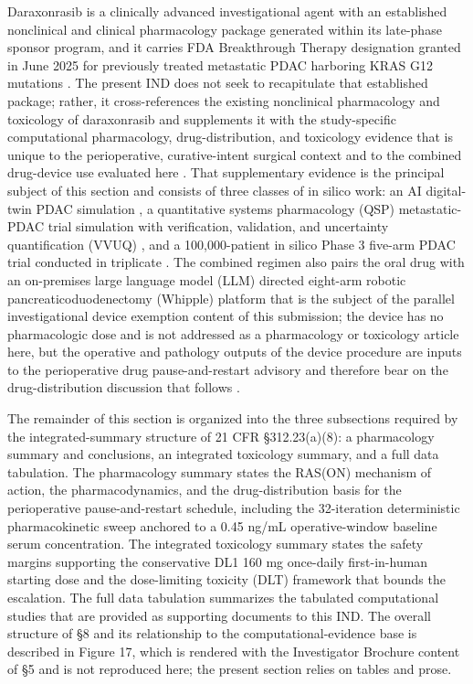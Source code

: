 Daraxonrasib is a clinically advanced investigational agent with an established
nonclinical and clinical pharmacology package generated within its late-phase
sponsor program, and it carries FDA Breakthrough Therapy designation granted in
June 2025 for previously treated metastatic PDAC harboring KRAS G12 mutations
\cite{daraxwhipple}. The present IND does not seek to recapitulate that
established package; rather, it cross-references the existing nonclinical
pharmacology and toxicology of daraxonrasib and supplements it with the
study-specific computational pharmacology, drug-distribution, and toxicology
evidence that is unique to the perioperative, curative-intent surgical context
and to the combined drug-device use evaluated here \cite{daraxwhipple,onpremwhippl}.
That supplementary evidence is the principal subject of this section and consists
of three classes of in silico work: an AI digital-twin PDAC simulation
\cite{fdadigtwinpc}, a quantitative systems pharmacology (QSP) metastatic-PDAC
trial simulation with verification, validation, and uncertainty quantification
(VVUQ) \cite{qspmetpancre}, and a 100,000-patient in silico Phase 3 five-arm
PDAC trial conducted in triplicate \cite{chatgpt100kp,pdacdigtwinp}. The combined
regimen also pairs the oral drug with an on-premises large language model (LLM)
directed eight-arm robotic pancreaticoduodenectomy (Whipple) platform that is the
subject of the parallel investigational device exemption content of this
submission; the device has no pharmacologic dose and is not addressed as a
pharmacology or toxicology article here, but the operative and pathology outputs
of the device procedure are inputs to the perioperative drug pause-and-restart
advisory and therefore bear on the drug-distribution discussion that follows
\cite{daraxwhipple}.

The remainder of this section is organized into the three subsections required
by the integrated-summary structure of 21 CFR \S 312.23(a)(8): a pharmacology
summary and conclusions, an integrated toxicology summary, and a full data
tabulation. The pharmacology summary states the RAS(ON) mechanism of action, the
pharmacodynamics, and the drug-distribution basis for the perioperative
pause-and-restart schedule, including the 32-iteration deterministic
pharmacokinetic sweep anchored to a 0.45 ng/mL operative-window baseline serum
concentration. The integrated toxicology summary states the safety margins
supporting the conservative DL1 160 mg once-daily first-in-human starting dose
and the dose-limiting toxicity (DLT) framework that bounds the escalation. The
full data tabulation summarizes the tabulated computational studies that are
provided as supporting documents to this IND. The overall structure of \S 8 and
its relationship to the computational-evidence base is described in Figure 17,
which is rendered with the Investigator Brochure content of \S 5 and is not
reproduced here; the present section relies on tables and prose.

